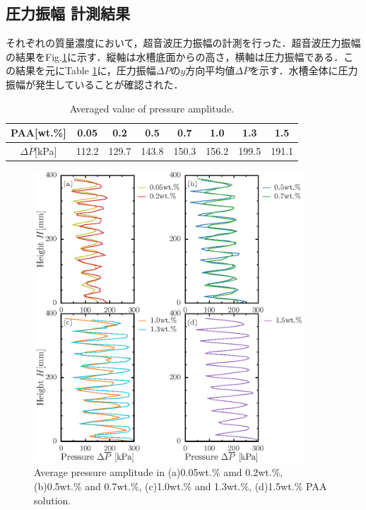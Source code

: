 \clearpage

\subsection{圧力振幅 計測結果}

それぞれの質量濃度において，超音波圧力振幅の計測を行った．超音波圧力振幅の結果をFig.\ref{fig:pressure}に示す．縦軸は水槽底面からの高さ，横軸は圧力振幅である．この結果を元にTable \ref{table:press}に，圧力振幅$\Delta{}P$の$y$方向平均値$\Delta\overline{P}$を示す．水槽全体に圧力振幅が発生していることが確認された．

\begin{table}[h]
	\centering
	\caption{Averaged value of pressure amplitude.}
	\label{table:press}
	\begin{tabular}{c|c|c|c|c|c|c|c} \hline
		PAA[wt.\%]                & 0.05  & 0.2   & 0.5   & 0.7   & 1.0   & 1.3   & 1.5   \\ \hline \hline
		$\Delta\overline{P}$[kPa] & 112.2 & 129.7 & 143.8 & 150.3 & 156.2 & 199.5 & 191.1 \\ \hline
	\end{tabular}
\end{table}

\begin{figure}[ht]
	\centering
	\includegraphics[width=0.9\textwidth]{3-Physical_Property/press.eps}
	\caption{Average pressure amplitude in (a)0.05wt.\% amd 0.2wt.\%, (b)0.5wt.\% and 0.7wt.\%, (c)1.0wt.\% and 1.3wt.\%, (d)1.5wt.\% PAA solution.}
	\label{fig:pressure}
\end{figure}
